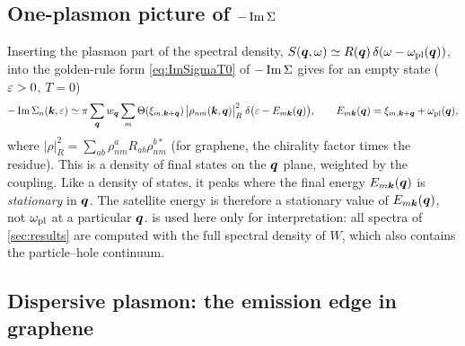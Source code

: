 \subsection{One-plasmon picture of $-\operatorname{Im}\Sigma$}

Inserting the plasmon part of the spectral density, $S(\bm q,\omega)\simeq R(\bm q)\,\delta(\omega-\omega_{\rm pl}(\bm q))$, into
the golden-rule form \eqref{eq:ImSigmaT0} of $-\operatorname{Im}\Sigma$ gives for an empty state ($\varepsilon>0$, $T=0$)
\begin{equation}
-\operatorname{Im}\Sigma_{n}(\bm k,\varepsilon)\simeq\pi\sum_{\bm q}w_{\bm q}\sum_m\Theta(\xi_{m,\bm k+\bm q})\,
\bigl|\rho_{nm}(\bm k,\bm q)\bigr|^2_{R}\;\delta\bigl(\varepsilon-E_{m\bm k}(\bm q)\bigr),\qquad
E_{m\bm k}(\bm q)=\xi_{m,\bm k+\bm q}+\omega_{\rm pl}(\bm q),
\label{eq:onePlasmon}
\end{equation}
where $|\rho|^2_R=\sum_{ab}\rho^a_{nm}R_{ab}\rho^{b*}_{nm}$ (for graphene, the chirality factor times the residue). This
is a density of final states on the $\bm q$ plane, weighted by the coupling. Like a density of states, it peaks
where the final energy $E_{m\bm k}(\bm q)$ is \emph{stationary} in $\bm q$. The satellite energy is therefore a stationary
value of $E_{m\bm k}(\bm q)$, not $\omega_{\rm pl}$ at a particular $\bm q$.  is used here only for
interpretation: all spectra of \cref{sec:results} are computed with the full spectral density of $W$, which also
contains the particle--hole continuum.

\subsection{Dispersive plasmon: the emission edge in graphene}
\label{sec:edge}

